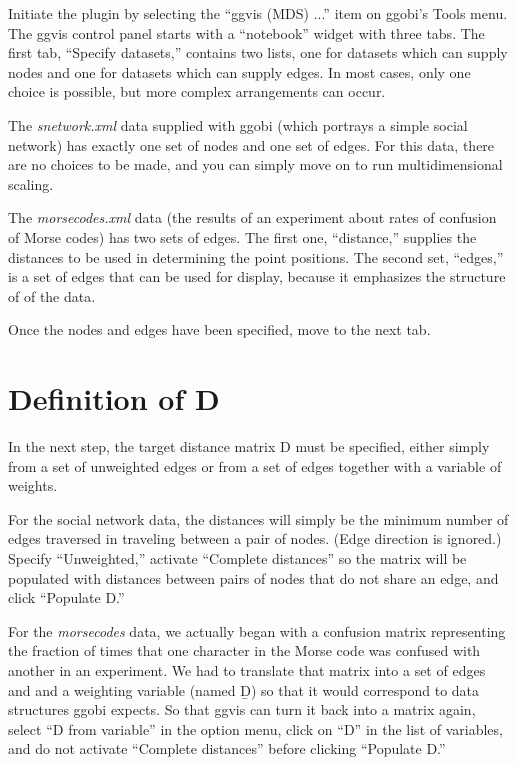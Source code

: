 \documentclass[11pt]{article}
\begin{document}
Initiate the plugin by selecting the ``ggvis (MDS) ...'' item on ggobi's
Tools menu.  The ggvis control panel starts with a ``notebook''
widget with three tabs.  The first tab, ``Specify datasets,'' contains
two lists, one for datasets which can supply nodes and one for datasets
which can supply edges.  In most cases, only one choice is possible,
but more complex arrangements can occur.

The {\em snetwork.xml} data supplied with ggobi (which portrays a
simple social network) has exactly one set of nodes and one set of
edges.  For this data, there are no choices to be made, and you can
simply move on to run multidimensional scaling.

The {\em morsecodes.xml} data (the results of an experiment about
rates of confusion of Morse codes) has two sets of edges.  The first
one, ``distance,'' supplies the distances to be used in determining
the point positions.  The second set, ``edges,'' is a set of edges
that can be used for display, because it emphasizes the structure of
of the data.

Once the nodes and edges have been specified, move to the next tab.

\section{Definition of D}

In the next step, the target distance matrix D must be specified, either
simply from a set of unweighted edges or from a set of edges together with
a variable of weights.

For the social network data, the distances will simply be the minimum
number of edges traversed in traveling between a pair of nodes.  (Edge
direction is ignored.)  Specify ``Unweighted,'' activate ``Complete
distances'' so the matrix will be populated with distances between
pairs of nodes that do not share an edge, and click ``Populate D.''

For the {\em morsecodes} data, we actually began with a confusion
matrix representing the fraction of times that one character in the
Morse code was confused with another in an experiment.  We had to
translate that matrix into a set of edges and and a weighting variable
(named {\b D}) so that it would correspond to data structures ggobi
expects.  So that ggvis can turn it back into a matrix again, select
``D from variable'' in the option menu, click on ``D'' in the list of
variables, and do not activate ``Complete distances'' before clicking
``Populate D.''
\end{document}
